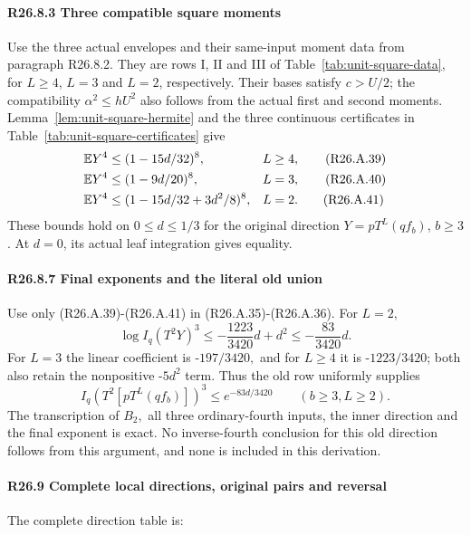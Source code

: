 \paragraph{R26.8.3 Three compatible square moments}

Use the three actual envelopes and their same-input moment data from
paragraph R26.8.2. They are rows I, II and III of
Table~\ref{tab:unit-square-data}, for $L\ge4$, $L=3$ and $L=2$,
respectively. Their bases satisfy $c>U/2$; the compatibility
$\alpha^2\le hU^2$ also follows from the actual first and second
moments. Lemma~\ref{lem:unit-square-hermite} and the three continuous
certificates in Table~\ref{tab:unit-square-certificates} give
\begin{align}
 \mathbb E Y^4&\le(1-15d/32)^8,
 &&L\ge4,\tag{R26.A.39}\label{eq:unit-R26:fourth-long}\\
 \mathbb E Y^4&\le(1-9d/20)^8,
 &&L=3,\tag{R26.A.40}\label{eq:unit-R26:fourth-three}\\
 \mathbb E Y^4&\le(1-15d/32+3d^2/8)^8,
 &&L=2.\tag{R26.A.41}\label{eq:unit-R26:fourth-two}
\end{align}
These bounds hold on $0\le d\le1/3$ for the original direction
$Y=pT^L(qf_b)$, $b\ge3$. At $d=0$, its actual leaf integration
gives equality.

\paragraph{R26.8.7 Final exponents and the literal old union}

Use only (R26.A.39)-(R26.A.41) in (R26.A.35)-(R26.A.36). For \(L=2,\allowbreak \)
\[
\log I_q(T^2Y)^3
\le-\frac{1223}{3420}d+d^2
\le-\frac{83}{3420}d.
\]
For \(L=3\) the linear coefficient is -\(197/3420,\allowbreak \) and for \(L\ge 4\) it is
-\(1223/3420\); both also retain the nonpositive -\(5d^2\) term.
Thus the old row uniformly supplies
\[
I_q(T^2[pT^L(qf_b)])^3\le e^{-83d/3420}
\qquad(b\ge3,L\ge2).
\]
The transcription of \(B_2,\allowbreak \) all three ordinary-fourth inputs,
the inner direction and the final exponent is exact. No inverse-fourth
conclusion for this old direction follows from this argument, and none
is included in this derivation.

\paragraph{R26.9 Complete local directions, original pairs and reversal}

The complete direction table is:


